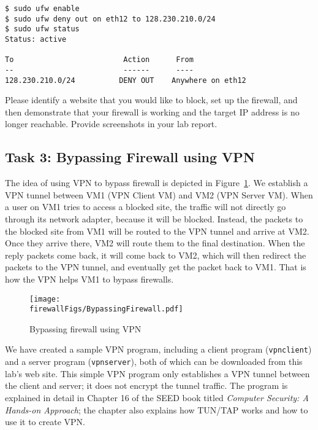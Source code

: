 \begin{lstlisting}
$ sudo ufw enable
$ sudo ufw deny out on eth12 to 128.230.210.0/24
$ sudo ufw status
Status: active

To                         Action      From
--                         ------      ----
128.230.210.0/24          DENY OUT    Anywhere on eth12
\end{lstlisting}


 
Please identify a website that you would like to block, set up the firewall,
and then demonstrate that your firewall is working and the target IP address is no longer 
reachable. Provide screenshots in your lab report.  




\subsection{Task 3: Bypassing Firewall using VPN}



The idea of using VPN to bypass firewall is depicted in 
Figure~\ref{vpn_firewall:fig:bypassing}. 
We establish a VPN tunnel between VM1 (VPN Client VM) 
and VM2 (VPN Server VM). 
When a user on VM1 tries to access a blocked site, the traffic will not directly 
go through its network adapter, because it will be blocked. Instead, the 
packets to the blocked site from VM1 will be routed to the VPN tunnel and arrive at VM2. Once
they arrive there, VM2 will route them to the final destination. 
When the reply packets come back, it will come back to VM2, which will then redirect the
packets to the VPN tunnel, and eventually get the packet back to VM1. That is how the VPN helps
VM1 to bypass firewalls. 

\begin{figure}[htb]
\begin{center}
\texttt{[image: \\firewallFigs/BypassingFirewall.pdf]}
\end{center}
\caption{Bypassing firewall using VPN}
\label{vpn_firewall:fig:bypassing}
\end{figure}
 


We have created a sample VPN program, including a client program (\texttt{vpnclient})  and
a server program (\texttt{vpnserver}), both of which can be downloaded from
this lab's web site. This simple VPN program only establishes a VPN tunnel 
between the client and server; it does not encrypt the tunnel traffic.
The program is explained in detail in Chapter 16 of the SEED book titled
\textit{Computer Security: A Hands-on Approach}; the chapter also
explains how TUN/TAP works and how to use it to create VPN.


